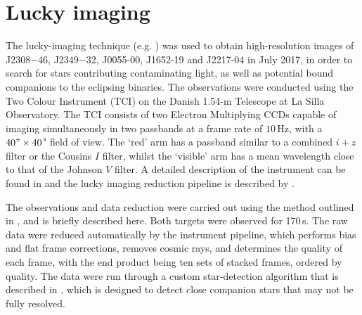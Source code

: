 \section{Lucky imaging}

The lucky-imaging technique (e.g. \citealt{2006A&A...446..739L}) was used to obtain high-resolution images of J2308$-$46, J2349$-$32, J0055-00, J1652-19 and J2217-04 in July 2017, in order to search for stars contributing contaminating light, as well as potential bound companions to the eclipsing binaries. The observations were conducted using the Two Colour Instrument (TCI) on the Danish 1.54-m Telescope at La Silla Observatory. The TCI consists of two Electron Multiplying CCDs capable of imaging simultaneously in two passbands at a frame rate of $10$\,Hz, with a $40"\times40$" field of view. The `red' arm has a passband similar to a combined $i+z$ filter or the Cousins $I$ filter, whilst the `visible' arm has a mean wavelength close to that of the Johnson $V$ filter. A detailed description of the instrument  can be found in \citet{2015A26A...574A..54S} and  the lucky imaging reduction pipeline is described by \citet{2012A&A...542A..23H}.

The observations and data reduction were carried out using the method outlined in \citet{2018A26A...610A..20E}, and is briefly described here. Both targets were observed for 170\,s. The raw data were reduced automatically by the instrument pipeline, which performs bias and flat frame corrections, removes cosmic rays, and determines the quality of each frame, with the end product being ten sets of stacked frames, ordered by quality. The data were run through a custom star-detection algorithm that is described in \citet{2018A26A...610A..20E}, which is designed to detect close companion stars that may not be fully resolved.